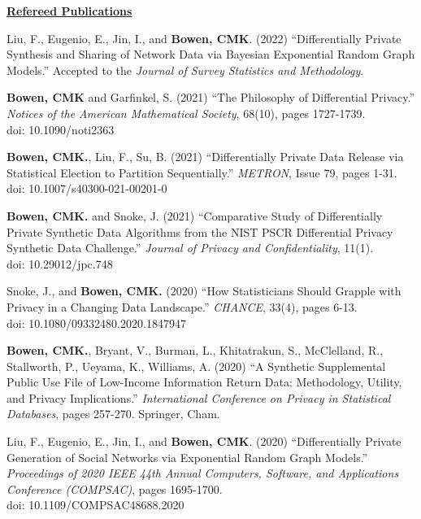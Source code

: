 \documentclass[11pt, letterpaper, roman]{moderncv} %
\begin{document}
\vspace{6pt}
\noindent\underline{\textbf{Refereed Publications}}
\vspace{4pt}
\begin{etaremune}[topsep=0pt, itemsep=2pt, partopsep=0pt, parsep=0pt]
    \item Liu, F., Eugenio, E., Jin, I., and \textbf{Bowen, CMK}. (2022) ``Differentially Private Synthesis and Sharing of Network Data via Bayesian Exponential Random Graph Models.'' Accepted to the \textit{Journal of Survey Statistics and Methodology}.
    
    \item \textbf{Bowen, CMK} and Garfinkel, S. (2021) ``The Philosophy of Differential Privacy.'' \textit{Notices of the American Mathematical Society}, 68(10), pages 1727-1739.\\
    doi: 10.1090/noti2363
    
    \item \textbf{Bowen, CMK.}, Liu, F., Su, B. (2021) ``Differentially Private Data Release via Statistical Election to Partition Sequentially.'' \textit{METRON}, Issue 79, pages 1-31.\\
    doi: 10.1007/s40300-021-00201-0
    
    \item \textbf{Bowen, CMK.} and Snoke, J. (2021) ``Comparative Study of Differentially Private Synthetic Data Algorithms from the NIST PSCR Differential Privacy Synthetic Data Challenge.'' \textit{Journal of Privacy and Confidentiality}, 11(1).\\
    doi: 10.29012/jpc.748
    
    \item Snoke, J., and \textbf{Bowen, CMK.} (2020) ``How Statisticians Should Grapple with Privacy in a Changing Data Landscape.'' \textit{CHANCE}, 33(4), pages 6-13.\\
    doi: 10.1080/09332480.2020.1847947
    
    \item \textbf{Bowen, CMK.}, Bryant, V., Burman, L., Khitatrakun, S., McClelland, R., Stallworth, P., Ueyama, K., Williams, A. (2020) ``A Synthetic Supplemental Public Use File of Low-Income Information Return Data: Methodology, Utility, and Privacy Implications.'' \textit{International Conference on Privacy in Statistical Databases}, pages 257-270. Springer, Cham.
    
    \item Liu, F., Eugenio, E., Jin, I., and \textbf{Bowen, CMK}. (2020) ``Differentially Private Generation of Social Networks via Exponential Random Graph Models.'' \textit{Proceedings of 2020 IEEE 44th Annual Computers, Software, and Applications Conference (COMPSAC)}, pages 1695-1700.\\
    doi: 10.1109/COMPSAC48688.2020


\end{etaremune}
\end{document}

